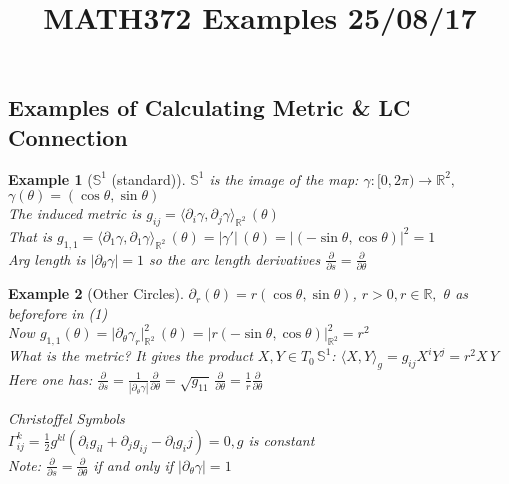 \documentclass[11pt]{article}
\title{MATH372 Examples	 25/08/17}
\author{}
\date{}
\theoremstyle{thm}
\newtheorem{example}{Example}
\newcommand{\vpi}[0]{\medskip \par \noindent}
\begin{document}
\maketitle
\subsection*{Examples of Calculating Metric \& LC Connection}
\begin{example}[$\mathbb{S}^1$ (standard)]
$\mathbb{S}^1$ is the image of the map: $\gamma: [0,2\pi)\rightarrow \mathbb{R}^2,$\\
$\gamma(\theta)=(\cos{\theta},\sin{\theta})	$\\[1em]
The induced metric is $g_{ij}=\Big\langle \partial_i\gamma, \partial_j\gamma\Big\rangle_{\mathbb{R}^2}\,(\theta)$\\[1em]
That is $g_{1,1}=\Big\langle \partial_1\gamma, \partial_1\gamma\Big\rangle_{\mathbb{R}^2}\,(\theta)=|\gamma'|\,(\theta) = |(-\sin{\theta}, \cos{\theta})|^2=1$\\[1em]
Arg length is $|\partial_\theta \gamma|=1$ so the arc length derivatives $\displaystyle\frac{\partial}{\partial s}=\displaystyle\frac{\partial}{\partial \theta}$\\
\end{example}
\begin{example}[Other Circles]
$\partial_r (\theta)=r(\cos{\theta}, \sin{\theta})$, $r>0, r\in \mathbb{R},$ $\theta$ as beforefore in (1)\\[1em]
Now $g_{1,1}(\theta)=\Big|\partial_\theta \gamma_r\Big|^2_{\mathbb{R}^2}\,(\theta) = \Big|r(-\sin{\theta}, \cos{\theta})\Big|^2_{\mathbb{R}^2}=r^2$\\[1em]
What is the metric? It gives the product $X,Y \in T_0\,\mathbb{S}^1$: $\big\langle X, Y \big\rangle_g = g_{ij}X^i Y^j =r^2 X\,Y$\\[1em]
Here one has:
$\displaystyle\frac{\partial}{\partial s}= \displaystyle\frac{1}{|\partial_\theta \gamma|}\displaystyle\frac{\partial}{\partial \theta}=\sqrt{g_{11}}\,\displaystyle\frac{\partial}{\partial \theta}=\displaystyle\frac{1}{r}\displaystyle\frac{\partial}{\partial \theta}$\\
\vpi
\textit{Christoffel Symbols}\\
$\Gamma_{ij}^k = \displaystyle\frac{1}{2}g^{kl}(\partial_i g_{il}+\partial_j g_{ij} - \partial_l g_ij) = 0, g$ is constant\\[1em]
Note: $\displaystyle\frac{\partial}{\partial s}=\displaystyle\frac{\partial}{\partial \theta}$ if and only if $|\partial_\theta \gamma|=1$\\
\end{example}
\end{document}

